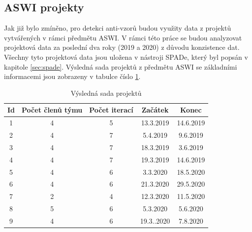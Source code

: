 \documentclass[czech,DP]{thesiskiv}
\begin{document}
\subsection{ASWI projekty}
Jak již bylo zmíněno, pro detekci anti-vzorů budou využity data z projektů vytvářených v rámci předmětu ASWI. V rámci této práce se budou analyzovat projektová data za poslední dva roky (2019 a 2020) z důvodu konzistence dat. Všechny tyto projektová data jsou uložena v nástroji SPADe, který byl popsán v kapitole \ref{sec:spade}.  
Výsledná sada projektů z předmětu ASWI se základními informacemi jsou zobrazeny v tabulce číslo \ref{tab:aswi_projects}.
\begin{center}
    \begin{table}[!htb]
    \caption{\label{tab:aswi_projects}Výsledná sada projektů}
    \begin{tabular}{|c|c|c|c|c|}
    \hline
    \textbf{Id} & \textbf{Počet členů týmu} & \textbf{Počet iterací} & \textbf{Začátek} & \textbf{Konec} \\ \hline \hline
1           & 4                         & 5                      & 13.3.2019        & 14.6.2019      \\ \hline
2           & 4                         & 7                      & 5.4.2019         & 9.6.2019       \\ \hline
3           & 4                         & 7                      & 18.3.2019        & 3.6.2019       \\ \hline
4           & 4                         & 7                      & 19.3.2019        & 14.6.2019      \\ \hline
5           & 4                         & 6                      & 3.3.2020         & 18.5.2020      \\ \hline
6           & 4                         & 6                      & 21.3.2020        & 29.5.2020      \\ \hline
7           & 2                         & 4                      & 12.3.2020        & 11.5.2020      \\ \hline
8           & 5                         & 6                      & 5.3.2020         & 5.6.2020       \\ \hline
9           & 4                         & 6                      & 19.3..2020       & 7.8.2020       \\ \hline
\end{tabular}
\end{table}
\end{center}
\end{document}
